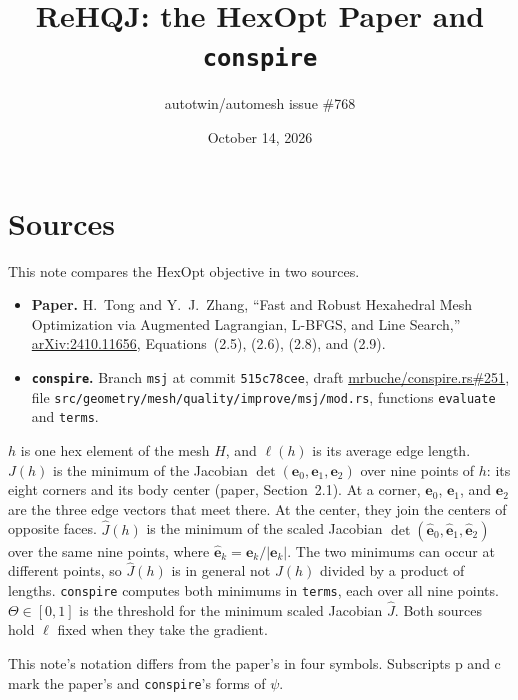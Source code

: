 \documentclass[11pt]{article}
\title{ReHQJ: the HexOpt Paper and \texttt{conspire}}
\author{autotwin/automesh issue \#768}
\date{October 14, 2026}
\newcommand{\Jh}{\hat{J}}
\begin{document}
\maketitle

\section*{Sources}

This note compares the HexOpt objective in two sources.

\begin{itemize}[leftmargin=*]\sloppy
  \item \textbf{Paper.} H.~Tong and Y.~J.~Zhang, ``Fast and Robust Hexahedral Mesh Optimization via Augmented Lagrangian, L-BFGS, and Line Search,'' \href{https://arxiv.org/pdf/2410.11656}{arXiv:2410.11656}, Equations~(2.5), (2.6), (2.8), and (2.9).
  \item \textbf{\texttt{conspire}.} Branch \texttt{msj} at commit \texttt{515c78cee}, draft \href{https://github.com/mrbuche/conspire.rs/pull/251}{mrbuche/conspire.rs\#251}, file \texttt{src/\allowbreak geometry/\allowbreak mesh/\allowbreak quality/\allowbreak improve/\allowbreak msj/\allowbreak mod.rs}, functions \texttt{evaluate} and \texttt{terms}.
\end{itemize}

$h$ is one hex element of the mesh $H$, and $\ell(h)$ is its average edge length.
$J(h)$ is the minimum of the Jacobian $\det(\mathbf{e}_0, \mathbf{e}_1, \mathbf{e}_2)$ over nine points of $h$: its eight corners and its body center (paper, Section~2.1).
At a corner, $\mathbf{e}_0$, $\mathbf{e}_1$, and $\mathbf{e}_2$ are the three edge vectors that meet there.
At the center, they join the centers of opposite faces.
$\Jh(h)$ is the minimum of the scaled Jacobian $\det(\hat{\mathbf{e}}_0, \hat{\mathbf{e}}_1, \hat{\mathbf{e}}_2)$ over the same nine points, where $\hat{\mathbf{e}}_k = \mathbf{e}_k / |\mathbf{e}_k|$.
The two minimums can occur at different points, so $\Jh(h)$ is in general not $J(h)$ divided by a product of lengths.
\texttt{conspire} computes both minimums in \texttt{terms}, each over all nine points.
$\Theta \in [0, 1]$ is the threshold for the minimum scaled Jacobian $\Jh$.
Both sources hold $\ell$ fixed when they take the gradient.

This note's notation differs from the paper's in four symbols.
Subscripts $\mathrm{p}$ and $\mathrm{c}$ mark the paper's and \texttt{conspire}'s forms of $\psi$.
\end{document}
